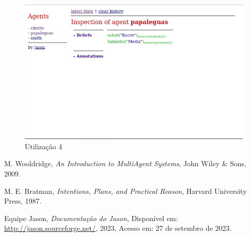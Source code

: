 \documentclass[12pt]{article}
\begin{document}
    \newpage

    \begin{figure}[!ht]
        \centering
        \includegraphics[width=1\textwidth]{figures/imagem04.jpeg}
        \caption{Utilização 4}
        \label{fig:imagem5}
    \end{figure}
    
\begin{thebibliography}{9}
M. Wooldridge,
\textit{An Introduction to MultiAgent Systems},
John Wiley \& Sons, 2009.

M. E. Bratman,
\textit{Intentions, Plans, and Practical Reason},
Harvard University Press, 1987.

Equipe Jason,
\textit{Documentação do Jason},
Disponível em: \url{http://jason.sourceforge.net/}, 2023, Acesso em: 27 de setembro de 2023.

\end{thebibliography}
\end{document}
